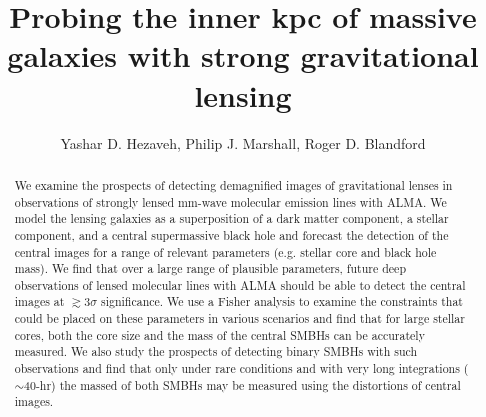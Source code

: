 \documentclass[chicago]{emulateapj}
\begin{document}
\title{Probing the inner kpc of massive galaxies with strong gravitational lensing}
\author{Yashar D. Hezaveh, Philip J. Marshall, Roger D. Blandford}  

\begin{abstract}  
\noindent
We examine the prospects of detecting demagnified images of gravitational lenses in observations of strongly lensed mm-wave molecular emission lines with ALMA. We model the lensing galaxies as a superposition of a dark matter component, a stellar component, and a central supermassive black hole and forecast the detection of the central images for a range of relevant parameters (e.g. stellar core and black hole mass).
We find that over a large range of plausible parameters, future deep observations of lensed molecular lines with ALMA should be able to detect the central images at $\gtrsim 3\sigma$ significance. We use a Fisher analysis to examine the  constraints that could be placed on these parameters in various scenarios and find that for large stellar cores, both the core size and the mass of the central SMBHs can be accurately measured. We also study the prospects of detecting binary SMBHs with such observations and find that only under rare conditions and with very long integrations ($\sim$40-hr) the massed of both SMBHs may be measured using the distortions of central images.


\end{abstract}



\end{document}
